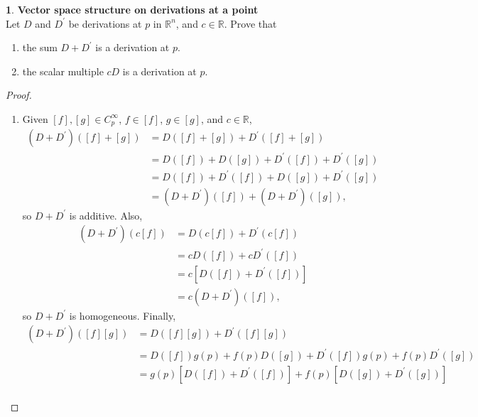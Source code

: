 \documentclass{article}
\theoremstyle{definition}
\newtheorem{ex}{}[section]
\begin{document}
\begin{ex}
	\textbf{Vector space structure on derivations at a point} \\
	Let $D$ and $D^\prime$ be derivations at $p$ in $\mathbb{R}^n$, and $c \in \mathbb{R}$.
	Prove that \begin{enumerate}[label=(\alph*)]
		\item the sum $D + D^\prime$ is a derivation at $p$.
		\item the scalar multiple $cD$ is a derivation at $p$.
	\end{enumerate}
\end{ex}
\begin{proof}
	\begin{enumerate}[label=(\alph*)]
		\item Given $[f], [g] \in C^\infty_p$, $f \in [f]$, $g \in [g]$, and $c \in \mathbb{R}$, \begin{align*}
			      (D + D^\prime)([f] + [g]) & = D([f] + [g]) + D^\prime([f] + [g])              \\
			                                & = D([f]) + D([g]) + D^\prime([f]) + D^\prime([g]) \\
			                                & = D([f]) + D^\prime([f]) + D([g]) + D^\prime([g]) \\
			                                & = (D + D^\prime)([f]) + (D + D^\prime)([g]),
		      \end{align*}
		      so $D + D^\prime$ is additive.
		      Also, \begin{align*}
			      (D + D^\prime)(c[f]) & = D(c[f]) + D^\prime(c[f])             \\
			                           & = cD([f]) + cD^\prime([f])             \\
			                           & = c\left[D([f]) + D^\prime([f])\right] \\
			                           & = c(D + D^\prime)([f]),
		      \end{align*}
		      so $D + D^\prime$ is homogeneous.
		      Finally, \begin{align*}
			      (D + D^\prime)([f][g]) & = D([f][g]) + D^\prime([f][g])                                                         \\
			                             & = D([f])g(p) + f(p)D([g]) + D^\prime([f])g(p) + f(p)D^\prime([g])                      \\
			                             & = g(p)\left[D([f]) + D^\prime([f])\right] + f(p) \left[ D([g]) + D^\prime([g]) \right] \\

\end{align*}
\end{enumerate}
\end{proof}
\end{document}
